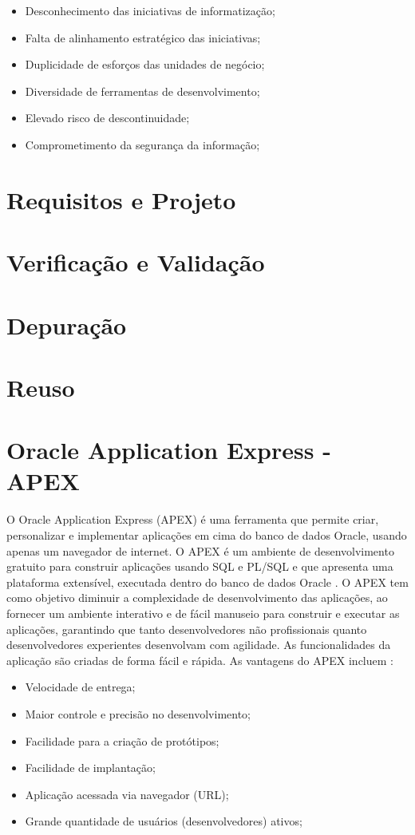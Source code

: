 \begin{itemize}
\item Desconhecimento das iniciativas de informatização;
\item Falta de alinhamento estratégico das iniciativas;
\item Duplicidade de esforços das unidades de negócio;
\item Diversidade de ferramentas de desenvolvimento;
\item Elevado risco de descontinuidade;
\item Comprometimento da segurança da informação;
\end{itemize}
\clearpage

\section{Requisitos e Projeto}

\section{Verificação e Validação}

\section{Depuração}

\section{Reuso}

\section{Oracle Application Express - APEX}

O Oracle Application Express (APEX) é uma ferramenta que permite criar, personalizar e implementar aplicações em cima do banco de dados Oracle, usando apenas um navegador de internet. O APEX é um ambiente de desenvolvimento gratuito para construir aplicações usando SQL e PL/SQL e que apresenta uma plataforma extensível, executada dentro do banco de dados Oracle \cite{oracleApex}. O APEX tem como objetivo diminuir a complexidade de desenvolvimento das aplicações, ao fornecer um ambiente interativo e de fácil manuseio para construir e executar as aplicações, garantindo que tanto desenvolvedores não profissionais quanto desenvolvedores experientes desenvolvam com agilidade. As funcionalidades da aplicação são criadas de forma fácil e rápida. As vantagens do APEX incluem \cite{oracleApex}:
\begin{itemize}
\item Velocidade de entrega;
\item Maior controle e precisão no desenvolvimento;
\item Facilidade para a criação de protótipos;
\item Facilidade de implantação;
\item Aplicação acessada via navegador (URL);
\item Grande quantidade de usuários (desenvolvedores) ativos;
\end{itemize}

